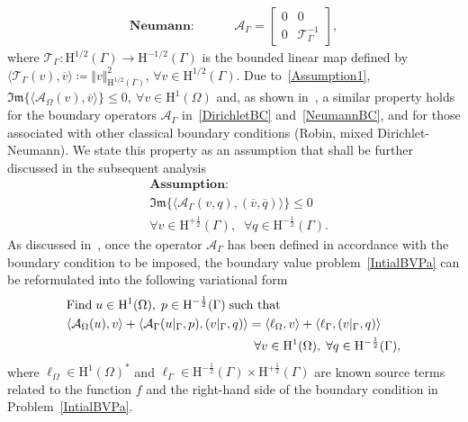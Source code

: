 \documentclass[a4paper,11pt]{article}
\newcommand{\mH}{\mathrm{H}}
\newcommand{\lbr}{\lbrack}
\newcommand{\rbr}{\rbrack}
\renewcommand{\Im}{\mathfrak{Im}} %
\begin{document}
\begin{align}\label{NeumannBC}
  \textbf{Neumann:}\hspace{1cm} &
  \mathcal{A}_{\Gamma} =
  \left\lbr\begin{array}{cc}
  0 & 0\\
  0 & \mathcal{T}_{\Gamma}^{-1}
  \end{array}\right\rbr, 
\end{align}
where $\mathcal{T}_\Gamma\colon \mH^{1/2}(\Gamma)\to
\mH^{-1/2}(\Gamma)$ is the bounded linear map defined
by \(\langle\mathcal{T}_\Gamma(v),\overline{v}\rangle \coloneq \Vert
v\Vert_{\mH^{1/2}(\Gamma)}^{2}\), \(\forall v\in \mH^{1/2}(\Gamma)\). 
Due to~\eqref{Assumption1}, $\Im\{\langle \mathcal{A}_{\Omega}(v),
\overline{v}\rangle\}\leq 0,\ \forall v\in \mH^{1}(\Omega)$ and, as shown 
in~\cite{MR4665035}, a similar property holds for the boundary
operators $\mathcal{A}_{\Gamma}$ in~\eqref{DirichletBC} and~\eqref{NeumannBC}, and for those associated with other classical boundary
conditions (Robin, mixed Dirichlet-Neumann). We state this property as
an assumption that shall be further discussed in the subsequent
analysis
\begin{equation}\label{Assumption2}
  \begin{aligned}
    & \textbf{Assumption:}\\
    & \Im\{\langle \mathcal{A}_{\Gamma}(v,q),(\overline{v},\overline{q})\rangle\}\leq 0\\
    & \forall v\in\mH^{+\frac{1}{2}}(\Gamma),\;\;\forall q\in\mH^{-\frac{1}{2}}(\Gamma).
  \end{aligned}
\end{equation}
As discussed in~\cite{MR4665035}, once the operator
$\mathcal{A}_{\Gamma}$ has been defined in accordance with the
boundary condition to be imposed, the boundary value problem~\eqref{IntialBVPa} can be reformulated into the following variational form
\begin{equation}\label{IntialBVP2}
  \begin{aligned}
    & \text{Find}\;u\in \mH^{1}(\Omega), \;p\in
    \mH^{-\frac{1}{2}}(\Gamma)\;\text{such that}\\
    & \langle \mathcal{A}_{\Omega}(u),v\rangle+\langle
    \mathcal{A}_{\Gamma}(u\vert_{\Gamma},p),
    (v\vert_{\Gamma},q)\rangle = \langle \ell_{\Omega}, v\rangle +
    \langle \ell_{\Gamma},(v\vert_{\Gamma},q)\rangle\\
    & \hspace{5.25cm} \forall v\in \mH^{1}(\Omega), \;
    \forall q\in \mH^{-\frac{1}{2}}(\Gamma),
  \end{aligned}
\end{equation}
where $\ell_{\Omega}\in \mH^1(\Omega)^*$ and $\ell_{\Gamma}\in
\mH^{-\frac{1}{2}}(\Gamma)\times \mH^{+\frac{1}{2}}(\Gamma)$ are known
source terms related to the function $f$ and the right-hand side of the
boundary condition in Problem~\eqref{IntialBVPa}. 
\end{document}
